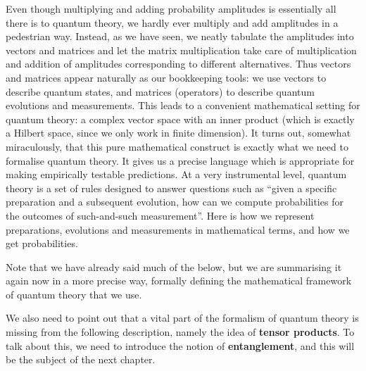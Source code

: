 \documentclass[fleqn]{article}
\begin{document}
Even though multiplying and adding probability amplitudes is essentially all there is to quantum theory, we hardly ever multiply and add amplitudes in a pedestrian way.
Instead, as we have seen, we neatly tabulate the amplitudes into vectors and matrices and let the matrix multiplication take care of multiplication and addition of amplitudes corresponding to different alternatives.
Thus vectors and matrices appear naturally as our bookkeeping tools: we use vectors to describe quantum states, and matrices (operators) to describe quantum evolutions and measurements.
This leads to a convenient mathematical setting for quantum theory: a complex vector space with an inner product (which is exactly a Hilbert space, since we only work in finite dimension).
It turns out, somewhat miraculously, that this pure mathematical construct is exactly what we need to formalise quantum theory.
It gives us a precise language which is appropriate for making empirically testable predictions.
At a very instrumental level, quantum theory is a set of rules designed to answer questions such as ``given a specific preparation and a subsequent evolution, how can we compute probabilities for the outcomes of such-and-such measurement''.
Here is how we represent preparations, evolutions and measurements in mathematical terms, and how we get probabilities.

Note that we have already said much of the below, but we are summarising it again now in a more precise way, formally defining the mathematical framework of quantum theory that we use.

We also need to point out that a vital part of the formalism of quantum theory is missing from the following description, namely the idea of \textbf{tensor products}.
To talk about this, we need to introduce the notion of \textbf{entanglement}, and this will be the subject of the next chapter.
\end{document}
